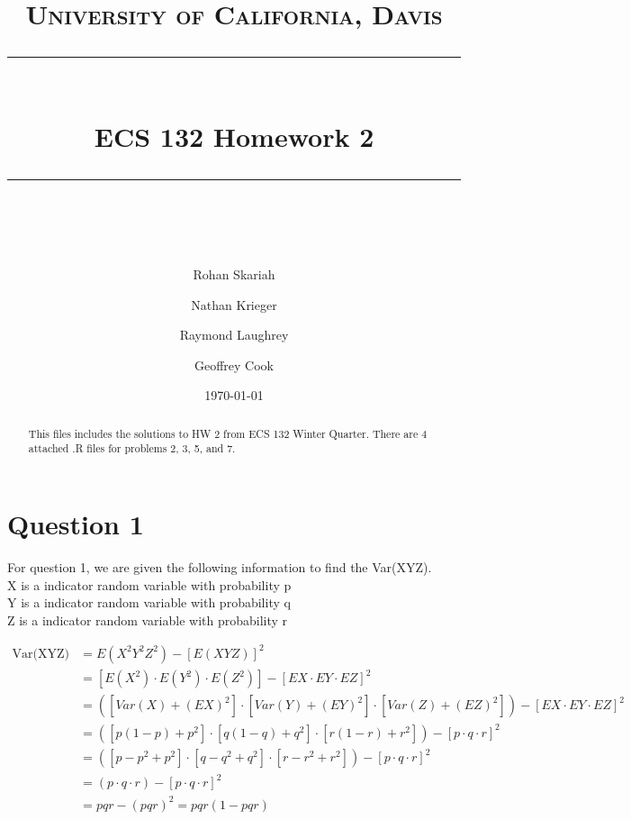 \documentclass{article}
\numberwithin{equation}{section}
\newcommand{\eqname}[1]{\tag*{#1}}%
\begin{document}
\title{	
	\normalfont\normalsize
	\textsc{University of California, Davis} \\ %
	\vspace{25pt} %
	\rule{\linewidth}{0.5pt} \\ %
	\vspace{20pt} %
	{\huge ECS 132 Homework 2} \\ %
	\vspace{12pt} %
	\rule{\linewidth}{2pt} \\ %
	\vspace{12pt} %
}

\author{Rohan Skariah \and Nathan Krieger \and Raymond Laughrey \and Geoffrey Cook}
\date{\normalsize\today}
\maketitle

\begin{abstract}
This files includes the solutions to HW 2 from ECS 132 Winter Quarter. There are 4 attached .R files for problems 2, 3, 5, and 7.
\end{abstract}

\section{Question 1}

For question 1, we are given the following information to find the Var(XYZ).
\\ \indent 
X is a indicator random variable with probability p
\\ \indent 
Y is a indicator random variable with probability q
\\ \indent
Z is a indicator random variable with probability r


\begin{align} 
	    \label{Var(XYZ)}
		\text{Var(XYZ)} &=  E(X^2Y^2Z^2) - [E(XYZ)]^2\eqname{} \\
		&= [E(X^2) \cdot E(Y^2) \cdot E(Z^2)] - [EX \cdot EY \cdot EZ]^2 \eqname{} \\
		&= ([Var(X) + (EX)^2] \cdot [Var(Y) + (EY)^2] \cdot [Var(Z) + (EZ)^2]) - [EX \cdot EY \cdot EZ]^2 \eqname{} \\
		&= ([p(1-p) + p^2] \cdot [q(1-q) + q^2] \cdot [r(1-r) + r^2]) - [p \cdot q \cdot r]^2 \eqname{Using 3.78 and 3.79} \\
		&= ([p - p^2 + p^2] \cdot [q - q^2 + q^2] \cdot [r - r^2 + r^2]) - [p \cdot q \cdot r]^2 \eqname{} \\
		&= (p \cdot q \cdot r) - [p \cdot q \cdot r]^2 \eqname{} \\
		&= pqr - (pqr)^2  = pqr(1-pqr) \eqname{} \\
\end{align}
\end{document}
